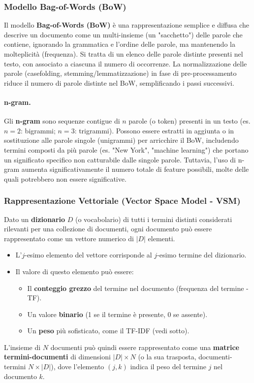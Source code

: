 \documentclass{article}
\begin{document}
\subsubsection{Modello Bag-of-Words (BoW)}
Il modello \textbf{Bag-of-Words (BoW)} è una rappresentazione semplice e diffusa che descrive un documento come un multi-insieme (un "sacchetto") delle parole che contiene, ignorando la grammatica e l'ordine delle parole, ma mantenendo la molteplicità (frequenza).
Si tratta di un elenco delle parole distinte presenti nel testo, con associato a ciascuna il numero di occorrenze. La normalizzazione delle parole (casefolding, stemming/lemmatizzazione) in fase di pre-processamento riduce il numero di parole distinte nel BoW, semplificando i passi successivi.

\paragraph{n-gram.}
Gli \textbf{n-gram} sono sequenze contigue di $n$ parole (o token) presenti in un testo (es. $n=2$: bigrammi; $n=3$: trigrammi). Possono essere estratti in aggiunta o in sostituzione alle parole singole (unigrammi) per arricchire il BoW, includendo termini composti da più parole (es. "New York", "machine learning") che portano un significato specifico non catturabile dalle singole parole. Tuttavia, l'uso di n-gram aumenta significativamente il numero totale di feature possibili, molte delle quali potrebbero non essere significative.

\subsubsection{Rappresentazione Vettoriale (Vector Space Model - VSM)}
Dato un \textbf{dizionario} $D$ (o vocabolario) di tutti i termini distinti considerati rilevanti per una collezione di documenti, ogni documento può essere rappresentato come un vettore numerico di $|D|$ elementi.
\begin{itemize}
    \item L'$j$-esimo elemento del vettore corrisponde al $j$-esimo termine del dizionario.
    \item Il valore di questo elemento può essere:
          \begin{itemize}
              \item Il \textbf{conteggio grezzo} del termine nel documento (frequenza del termine - TF).
              \item Un valore \textbf{binario} (1 se il termine è presente, 0 se assente).
              \item Un \textbf{peso} più sofisticato, come il TF-IDF (vedi sotto).
          \end{itemize}
\end{itemize}
L'insieme di $N$ documenti può quindi essere rappresentato come una \textbf{matrice termini-documenti} di dimensioni $|D| \times N$ (o la sua trasposta, documenti-termini $N \times |D|$), dove l'elemento $(j,k)$ indica il peso del termine $j$ nel documento $k$.
\end{document}
